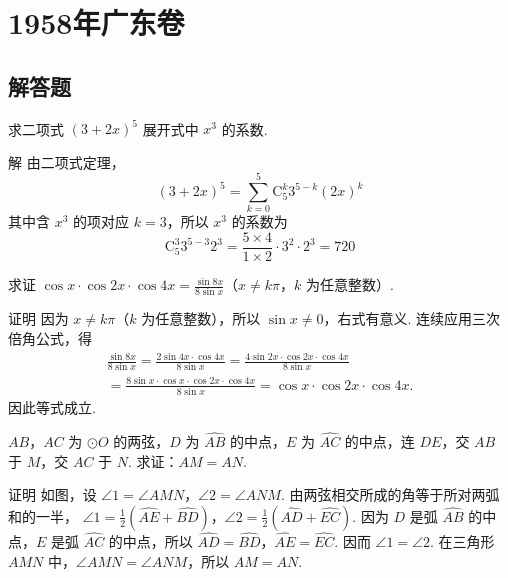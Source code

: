 \chapter{1958年广东卷}

\section{解答题}

\begin{problem}
求二项式 \(\left(3+2x\right)^{5}\) 展开式中 \(x^{3}\) 的系数.
\end{problem}

\begin{solution}
解 由二项式定理，
\[
\left(3+2x\right)^{5}=\sum_{k=0}^{5}\mathrm C_{5}^{k}3^{5-k}\left(2x\right)^{k}
\]
其中含 \(x^{3}\) 的项对应 \(k=3\)，所以 \(x^{3}\) 的系数为
\[
\mathrm C_{5}^{3}3^{5-3}2^{3}=\frac{5\times4}{1\times2}\cdot3^{2}\cdot2^{3}=720
\]
\end{solution}

\begin{problem}
求证 \(\cos x\cdot\cos 2x\cdot\cos 4x=\frac{\sin 8x}{8\sin x}\)（\(x\neq k\pi\)，\(k\) 为任意整数）.
\end{problem}

\begin{solution}
证明 因为 \(x\neq k\pi\)（\(k\) 为任意整数），所以 \(\sin x\neq0\)，右式有意义. 连续应用三次倍角公式，得
\[
\begin{gathered}
\frac{\sin 8x}{8\sin x}
=\frac{2\sin 4x\cdot\cos 4x}{8\sin x}
=\frac{4\sin 2x\cdot\cos 2x\cdot\cos 4x}{8\sin x}\\
=\frac{8\sin x\cdot\cos x\cdot\cos 2x\cdot\cos 4x}{8\sin x}
=\cos x\cdot\cos 2x\cdot\cos 4x.
\end{gathered}
\]
因此等式成立.
\end{solution}

\begin{problem}
\(AB\)，\(AC\) 为 \(\odot O\) 的两弦，\(D\) 为 \(\widehat{AB}\) 的中点，\(E\) 为 \(\widehat{AC}\) 的中点，连 \(DE\)，交 \(AB\) 于 \(M\)，交 \(AC\) 于 \(N\). 求证：\(AM=AN\).
\end{problem}

\begin{solution}
证明 如图，设 \(\angle 1=\angle AMN\)，\(\angle 2=\angle ANM\). 由两弦相交所成的角等于所对两弧和的一半，
\(\angle 1=\frac{1}{2}\left(\widehat{AE}+\widehat{BD}\right)\)，\(\angle 2=\frac{1}{2}\left(\widehat{AD}+\widehat{EC}\right)\).
因为 \(D\) 是弧 \(\widehat{AB}\) 的中点，\(E\) 是弧 \(\widehat{AC}\) 的中点，所以 \(\widehat{AD}=\widehat{BD}\)，\(\widehat{AE}=\widehat{EC}\). 因而 \(\angle 1=\angle 2\). 在三角形 \(AMN\) 中，\(\angle AMN=\angle ANM\)，所以 \(AM=AN\).
\end{solution}

